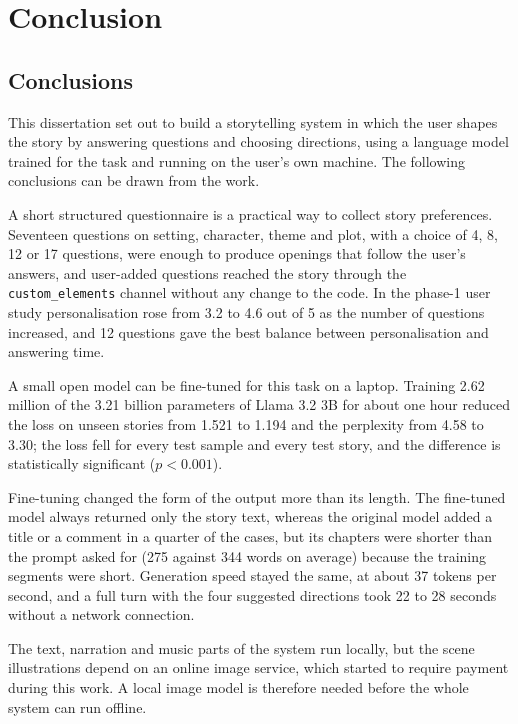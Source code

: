 \chapter{Conclusion}
\label{ch:conclusion}

\section{Conclusions}
\label{sec:con-conclusions}

This dissertation set out to build a storytelling system in which the user shapes the story by answering questions and choosing directions, using a language model trained for the task and running on the user's own machine. The following conclusions can be drawn from the work.

A short structured questionnaire is a practical way to collect story preferences. Seventeen questions on setting, character, theme and plot, with a choice of 4, 8, 12 or 17 questions, were enough to produce openings that follow the user's answers, and user-added questions reached the story through the \texttt{custom\_elements} channel without any change to the code. In the phase-1 user study personalisation rose from 3.2 to 4.6 out of 5 as the number of questions increased, and 12 questions gave the best balance between personalisation and answering time.

A small open model can be fine-tuned for this task on a laptop. Training 2.62 million of the 3.21 billion parameters of Llama 3.2 3B for about one hour reduced the loss on unseen stories from 1.521 to 1.194 and the perplexity from 4.58 to 3.30; the loss fell for every test sample and every test story, and the difference is statistically significant ($p < 0.001$).

Fine-tuning changed the form of the output more than its length. The fine-tuned model always returned only the story text, whereas the original model added a title or a comment in a quarter of the cases, but its chapters were shorter than the prompt asked for (275 against 344 words on average) because the training segments were short. Generation speed stayed the same, at about 37 tokens per second, and a full turn with the four suggested directions took 22 to 28 seconds without a network connection.

The text, narration and music parts of the system run locally, but the scene illustrations depend on an online image service, which started to require payment during this work. A local image model is therefore needed before the whole system can run offline.

